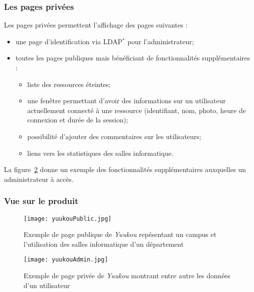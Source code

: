\subsubsection{Les pages priv\'ees}

\noindent Les pages priv\'ees permettent l'affichage des pages suivantes :
\begin{itemize}
	\item une page d'identification via LDAP$^*$ pour l'administrateur;
	\item toutes les pages publiques mais b\'en\'eficiant de fonctionnalit\'es suppl\'ementaires :
	\begin{itemize}
		\item liste des ressources \'eteintes;
		\item une fen\^etre permettant d'avoir des informations sur un utilisateur actuellement connect\'e \`a une ressource (identifiant, nom, photo, heure de connexion et dur\'ee de la session);
		\item possibilit\'e d'ajouter des commentaires sur les utilisateurs;
		\item liens vers les statistiques des salles informatique.

	\end{itemize}

\end{itemize}

La figure~\ref{yuukouAdmin} donne un exemple des fonctionnalit\'es suppl\'ementaires auxquelles un administrateur \`a acc\`es.

\clearpage

\subsubsection{Vue sur le produit}

\begin{figure}[!ht]
	\centering
	\texttt{[image: yuukouPublic.jpg]}
	\caption{Exemple de page publique de \textit{Yuukou} rep\'esentant un campus et l'utilisation des salles informatique d'un d\'epartement}
	\label{yuukouPublic}

\end{figure}

\begin{figure}[!ht]
	\centering
	\texttt{[image: yuukouAdmin.jpg]}
	\caption{Exemple de page priv\'ee de \textit{Yuukou} montrant entre autre les donn\'ees d'un utilisateur}
	\label{yuukouAdmin}

\end{figure}

